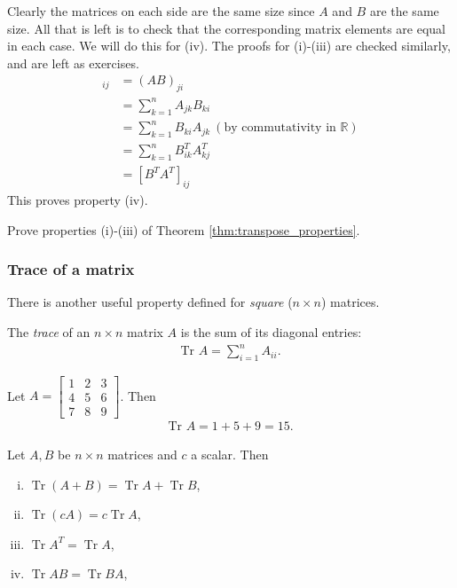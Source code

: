 \documentclass[12pt,letterpaper,reqno]{article}
\numberwithin{equation}{section}
\DeclareMathOperator{\Tr}{Tr}
\begin{document}
\begin{pf}
Clearly the matrices on each side are the same size since $A$ and $B$ are the same size. All that is left is to check that the corresponding matrix elements are equal in each case. We will do this for (iv). The proofs for (i)-(iii) are checked similarly, and are left as exercises. 
\begin{align*}
	[(AB)^T]_{ij}&=(AB)_{ji} \\
	&=\sum_{k=1}^n A_{jk}B_{ki} \\
	&=\sum_{k=1}^n B_{ki}A_{jk} \ (\text{by commutativity in } \mathbb{R}) \\
	&=\sum_{k=1}^n B^T_{ik}A^T_{kj} \\
	&=[B^TA^T]_{ij}	
\end{align*}
This proves property (iv).
\end{pf}

\begin{exercise}
Prove properties (i)-(iii) of Theorem \ref{thm:transpose_properties}.	
\end{exercise}


\subsubsection{Trace of a matrix}
There is another useful property defined for \emph{square} ($n \times n$) matrices.

\begin{defn}
	The \emph{trace} of an $n \times n$ matrix $A$ is the sum of its diagonal entries:
	\begin{align*}
		\text{Tr }A=\sum_{i=1}^n A_{ii}.
	\end{align*}
\end{defn}

\begin{example}
Let $A=\begin{bmatrix}
	1&2&3 \\ 4 & 5 & 6 \\ 7 & 8 & 9
\end{bmatrix}$. Then
\begin{align*}
	\text{Tr }A=1+5+9=15.
\end{align*}	
\end{example}

\begin{thm}\label{thm:trace_properties}
	Let $A,B$ be $n \times n$ matrices and $c$ a scalar. Then
	\begin{enumerate}[(i)]
		\item $\Tr (A+B)=\Tr A + \Tr B$,
		\item $\Tr(cA)=c\Tr A$, 
		\item $\Tr A^T=\Tr A$,
		\item $\Tr AB= \Tr BA$,
	\end{enumerate}
\end{thm}
\end{document}
